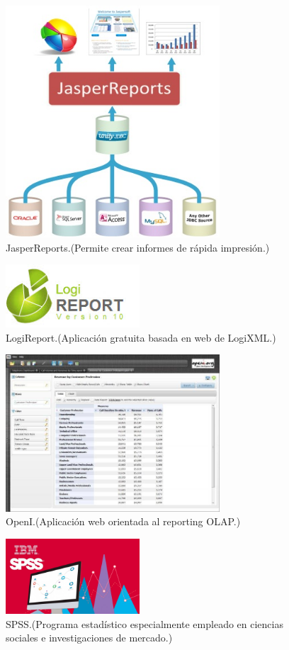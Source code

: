 \documentclass[a4paper,12pt,twocolumn]{article}
\begin{document}
\begin{figure}[h!]
\centering
\includegraphics[width=8cm]{./Imagenes/BIimagen11}
\caption{\label{fig:01}JasperReports.(Permite crear informes de rápida impresión.)}
\end{figure}

\begin{figure}[h!]
\centering
\includegraphics[width=5cm]{./Imagenes/BIimagen12}
\caption{\label{fig:01}LogiReport.(Aplicación gratuita basada en web de LogiXML.)}
\end{figure}

\begin{figure}[h!]
\centering
\includegraphics[width=8cm]{./Imagenes/BIimagen13}
\caption{\label{fig:01}OpenI.(Aplicación web orientada al reporting OLAP.)}
\end{figure}

\begin{figure}[h!]
\centering
\includegraphics[width=5cm]{./Imagenes/BIimagen14}
\caption{\label{fig:01}SPSS.(Programa estadístico especialmente empleado en ciencias sociales e investigaciones de mercado.)}
\end{figure}
\end{document}
